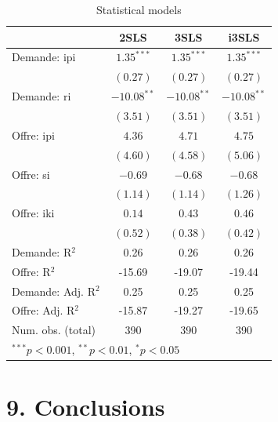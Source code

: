 \documentclass[11pt,]{article}
\begin{document}
\begin{table}[!htbp]
\begin{center}
\begin{tabular}{l c c c }
\hline
 & 2SLS & 3SLS & i3SLS \\
\hline
Demande: ipi        & $1.35^{***}$  & $1.35^{***}$  & $1.35^{***}$  \\
                    & $(0.27)$      & $(0.27)$      & $(0.27)$      \\
Demande: ri         & $-10.08^{**}$ & $-10.08^{**}$ & $-10.08^{**}$ \\
                    & $(3.51)$      & $(3.51)$      & $(3.51)$      \\
Offre: ipi          & $4.36$        & $4.71$        & $4.75$        \\
                    & $(4.60)$      & $(4.58)$      & $(5.06)$      \\
Offre: si           & $-0.69$       & $-0.68$       & $-0.68$       \\
                    & $(1.14)$      & $(1.14)$      & $(1.26)$      \\
Offre: iki          & $0.14$        & $0.43$        & $0.46$        \\
                    & $(0.52)$      & $(0.38)$      & $(0.42)$      \\
\hline
Demande: R$^2$      & 0.26          & 0.26          & 0.26          \\
Offre: R$^2$        & -15.69        & -19.07        & -19.44        \\
Demande: Adj. R$^2$ & 0.25          & 0.25          & 0.25          \\
Offre: Adj. R$^2$   & -15.87        & -19.27        & -19.65        \\
Num. obs. (total)   & 390           & 390           & 390           \\
\hline
\multicolumn{4}{l}{\scriptsize{$^{***}p<0.001$, $^{**}p<0.01$, $^*p<0.05$}}
\end{tabular}
\caption{Statistical models}
\label{table : 2sls, 3sls and fiml cluster 3}
\end{center}
\end{table}

\FloatBarrier

\hypertarget{conclusions}{%
\section{9. Conclusions}\label{conclusions}}
\end{document}
